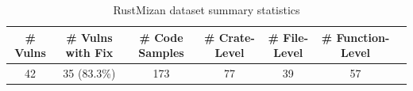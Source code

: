 \begin{table}[htbp]
\centering
\footnotesize
\caption{RustMizan dataset summary statistics}
\label{tab:dataset_summary}
\begin{tabular}{@{}ccccccc@{}}
\toprule
\textbf{\# Vulns} & \textbf{\# Vulns with Fix}  & \textbf{\# Code Samples} & \textbf{\# Crate-Level} & \textbf{\# File-Level} & \textbf{\# Function-Level} \\
\midrule
42 & 35 (83.3\%) & 173  & 77 & 39 & 57 \\
\bottomrule
\end{tabular}
\end{table}